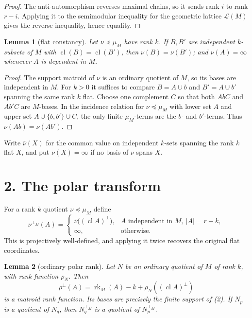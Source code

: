 \documentclass[12pt]{article}
\newcommand{\cL}{\mathcal L}
\newcommand{\rk}{\operatorname{rk}}
\newcommand{\cl}{\operatorname{cl}}
\newtheorem{lemma}{Lemma}
\begin{document}
\begin{proof}
The anti-automorphism reverses maximal chains, so it sends rank $i$ to
rank $r-i$.  Applying it to the semimodular inequality for the geometric
lattice $\cL(M)$ gives the reverse inequality, hence equality.
\end{proof}

\begin{lemma}[flat constancy]\label{lem:flatconst}
Let $\nu\preceq\mu_M$ have rank $k$.  If $B,B'$ are independent
$k$-subsets of $M$ with $\cl(B)=\cl(B')$, then $\nu(B)=\nu(B')$; and
$\nu(A)=\infty$ whenever $A$ is dependent in $M$.
\end{lemma}

\begin{proof}
The support matroid of $\nu$ is an ordinary quotient of $M$, so its
bases are independent in $M$.  For $k>0$ it suffices to compare
$B=A\cup b$ and $B'=A\cup b'$ spanning the same rank $k$ flat.  Choose
one complement $C$ so that both $AbC$ and $Ab'C$ are $M$-bases.  In the
incidence relation for $\nu\preceq\mu_M$ with lower set $A$ and upper
set $A\cup\{b,b'\}\cup C$, the only finite $\mu_M$-terms are the
$b$- and $b'$-terms.  Thus $\nu(Ab)=\nu(Ab')$.
\end{proof}

Write $\bar\nu(X)$ for the common value on independent $k$-sets spanning
the rank $k$ flat $X$, and put $\bar\nu(X)=\infty$ if no basis of $\nu$
spans $X$.

\section*{2. The polar transform}

For a rank $k$ quotient $\nu\preceq\mu_M$ define
\[
 \nu^{\perp_M}(A)=
 \begin{cases}
   \bar\nu\bigl((\cl A)^\perp\bigr),
      & A\text{ independent in }M,\ |A|=r-k,\\
   \infty,&\text{otherwise.}
 \end{cases}                                                 \tag{2}
\]
This is projectively well-defined, and applying it twice recovers the
original flat coordinates.

\begin{lemma}[ordinary polar rank]\label{lem:ordinary}
Let $N$ be an ordinary quotient of $M$ of rank $k$, with rank function
$\rho_N$.  Then
\[
        \rho^\perp(A)=\rk_M(A)-k+\rho_N((\cl A)^\perp)          \tag{3}
\]
is a matroid rank function.  Its bases are precisely the finite support
of (2).  If $N_p$ is a quotient of $N_q$, then
$N_q^{\perp_M}$ is a quotient of $N_p^{\perp_M}$.
\end{lemma}
\end{document}
